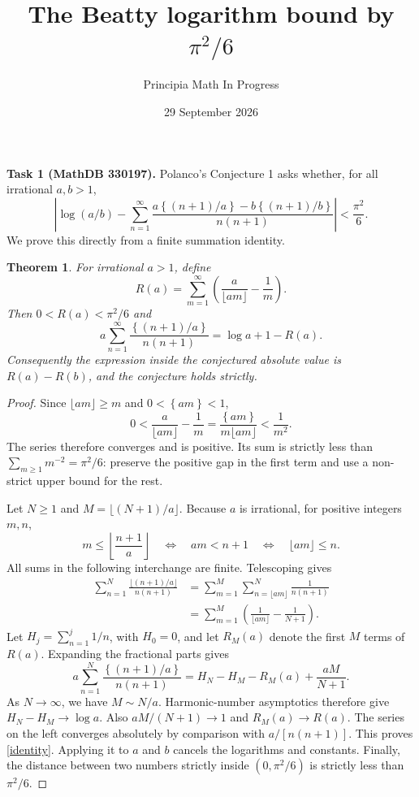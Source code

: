 \documentclass[11pt]{article}
\title{The Beatty logarithm bound by $\pi^2/6$}
\author{Principia Math In Progress}
\date{29 September 2026}
\newtheorem{theorem}{Theorem}
\newcommand{\fr}[1]{\left\{#1\right\}}
\begin{document}
\maketitle
\noindent\textbf{Task 1 (MathDB 330197).}
Polanco's Conjecture 1 \cite{polanco} asks whether, for all irrational
$a,b>1$,
\[
 \left|\log(a/b)-\sum_{n=1}^{\infty}
 \frac{a\fr{(n+1)/a}-b\fr{(n+1)/b}}{n(n+1)}\right|<\frac{\pi^2}{6}.
\]
We prove this directly from a finite summation identity.

\begin{theorem}
For irrational $a>1$, define
\[
 R(a)=\sum_{m=1}^{\infty}
 \left(\frac{a}{\lfloor am\rfloor}-\frac1m\right).
\]
Then $0<R(a)<\pi^2/6$ and
\begin{equation}\label{identity}
 a\sum_{n=1}^{\infty}\frac{\fr{(n+1)/a}}{n(n+1)}
 =\log a+1-R(a).
\end{equation}
Consequently the expression inside the conjectured absolute value is
$R(a)-R(b)$, and the conjecture holds strictly.
\end{theorem}
\begin{proof}
Since $\lfloor am\rfloor\ge m$ and $0<\fr{am}<1$,
\begin{equation}\label{term}
 0<\frac{a}{\lfloor am\rfloor}-\frac1m
 =\frac{\fr{am}}{m\lfloor am\rfloor}<\frac1{m^2}.
\end{equation}
The series therefore converges and is positive. Its sum is strictly less
than $\sum_{m\ge1}m^{-2}=\pi^2/6$: preserve the positive gap in the first
term and use a non-strict upper bound for the rest.

Let $N\ge1$ and $M=\lfloor(N+1)/a\rfloor$.
Because $a$ is irrational, for positive integers $m,n$,
\[
 m\le\left\lfloor\frac{n+1}{a}\right\rfloor
 \quad\Longleftrightarrow\quad
 am<n+1
 \quad\Longleftrightarrow\quad \lfloor am\rfloor\le n.
\]
All sums in the following interchange are finite. Telescoping gives
\begin{align*}
 \sum_{n=1}^{N}\frac{\lfloor(n+1)/a\rfloor}{n(n+1)}
 &=\sum_{m=1}^{M}\sum_{n=\lfloor am\rfloor}^{N}\frac1{n(n+1)}\\
 &=\sum_{m=1}^{M}\left(\frac1{\lfloor am\rfloor}-\frac1{N+1}\right).
\end{align*}
Let $H_j=\sum_{n=1}^{j}1/n$, with $H_0=0$, and let $R_M(a)$ denote
the first $M$ terms of $R(a)$. Expanding the fractional parts gives
\begin{equation}\label{finite}
 a\sum_{n=1}^{N}\frac{\fr{(n+1)/a}}{n(n+1)}
 =H_N-H_M-R_M(a)+\frac{aM}{N+1}.
\end{equation}
As $N\to\infty$, we have $M\sim N/a$. Harmonic-number asymptotics
therefore give $H_N-H_M\to\log a$. Also $aM/(N+1)\to1$ and
$R_M(a)\to R(a)$. The series on the left
converges absolutely by comparison with $a/[n(n+1)]$.
This proves \eqref{identity}. Applying it to $a$ and $b$ cancels the
logarithms and constants. Finally, the distance between two numbers
strictly inside $(0,\pi^2/6)$ is strictly less than $\pi^2/6$.
\end{proof}
\end{document}
